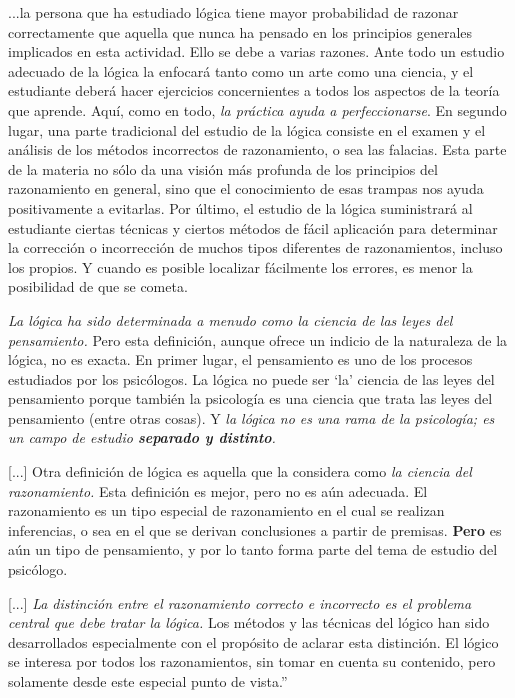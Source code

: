 \documentclass{article}
\begin{document}
    ...la persona que ha estudiado lógica tiene mayor probabilidad de razonar correctamente que aquella que nunca ha pensado en los principios generales implicados en esta actividad. Ello se debe a varias razones. Ante todo un estudio adecuado de la lógica la enfocará tanto como un arte como una ciencia, y el estudiante deberá hacer ejercicios concernientes a todos los aspectos de la teoría que aprende. Aquí, como en todo, \emph{la práctica ayuda a perfeccionarse}. En segundo lugar, una parte tradicional del estudio de la lógica consiste en el examen y el análisis de los métodos incorrectos de razonamiento, o sea las falacias. Esta parte de la materia no sólo da una visión más profunda de los principios del razonamiento en general, sino que el conocimiento de esas trampas nos ayuda positivamente a evitarlas. Por último, el estudio de la lógica suministrará al estudiante ciertas técnicas y ciertos métodos de fácil aplicación para determinar la corrección o incorrección de muchos tipos diferentes de razonamientos, incluso los propios. Y cuando es posible localizar fácilmente los errores, es menor la posibilidad de que se cometa. \par
    
    \emph{La lógica ha sido determinada a menudo como la ciencia de las leyes del pensamiento.} Pero esta definición, aunque ofrece un indicio de la naturaleza de la lógica, no es exacta. En primer lugar, el pensamiento es uno de los procesos estudiados por los psicólogos. La lógica no puede ser `la' ciencia de las leyes del pensamiento porque también la psicología es una ciencia que trata las leyes del pensamiento (entre otras cosas). Y \emph{la lógica no es una rama de la psicología; es un campo de estudio \textbf{separado y distinto}.} \par
    
    [...] Otra definición de lógica es aquella que la considera como \emph{la ciencia del razonamiento.} Esta definición es mejor, pero no es aún adecuada. El razonamiento es un tipo especial de razonamiento en el cual se realizan inferencias, o sea en el que se derivan conclusiones a partir de premisas. \textbf{Pero} es aún un tipo de pensamiento, y por lo tanto forma parte del tema de estudio del psicólogo. \par
    
    [...] \emph{La distinción entre el razonamiento correcto e incorrecto es el problema central que debe tratar la lógica.} Los métodos y las técnicas del lógico han sido desarrollados especialmente con el propósito de aclarar esta distinción. El lógico se interesa por todos los razonamientos, sin tomar en cuenta su contenido, pero solamente desde este especial punto de vista.'' \par
    
\end{document}
